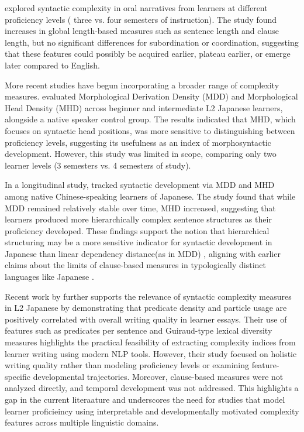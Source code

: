 \cite{Iwashita2006} explored syntactic complexity in oral narratives from learners at different proficiency levels (
three vs. four semesters of instruction). The study found increases in global length-based measures such as sentence
length and clause length, but no significant differences for subordination or coordination, suggesting that these
features could possibly be acquired earlier, plateau earlier, or emerge later compared to English.

More recent studies have begun incorporating a broader range of complexity measures. \citet{komori2019} evaluated
Morphological Derivation Density (MDD) and Morphological Head Density (MHD) across beginner and intermediate L2
Japanese learners, alongside a native speaker control group. The results indicated that MHD, which focuses on
syntactic head positions, was more sensitive to distinguishing between proficiency levels, suggesting its usefulness
as an index of morphosyntactic development. However, this study was limited in scope, comparing only two learner
levels (3 semesters vs. 4 semesters of study).

In a longitudinal study, \citet{Yang2023} tracked syntactic development via MDD and MHD among native Chinese-speaking
learners of Japanese. The study found that while MDD remained relatively stable over time, MHD increased, suggesting
that learners produced more hierarchically complex sentence structures as their proficiency developed. These
findings support the notion that hierarchical structuring may be a more sensitive indicator for syntactic development
in Japanese than linear dependency distance(as in MDD) , aligning with earlier claims about the limits of
clause-based measures in typologically distinct languages like Japanese \citep{Iwashita2006}.

Recent work by \citet{obata2025} further supports the relevance of syntactic complexity measures in L2
Japanese by demonstrating that predicate density and particle usage are positively correlated with overall writing
quality in learner essays. Their use of features such as predicates per sentence and Guiraud-type lexical diversity
measures highlights the practical feasibility of extracting complexity indices from learner writing using modern NLP
tools. However, their study focused on holistic writing quality rather than modeling proficiency levels or examining
feature-specific developmental trajectories. Moreover, clause-based measures were not analyzed directly, and
temporal development was not addressed. This highlights a gap in the current literaature and underscores the need for
studies that model learner proficieincy using interpretable and developmentally motivated complexity features across
multiple linguistic domains.

